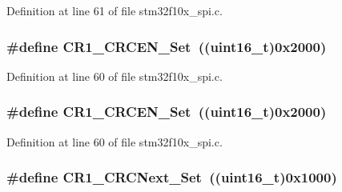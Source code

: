 Definition at line 61 of file stm32f10x\+\_\+spi.\+c.

\subsubsection[{\texorpdfstring{C\+R1\+\_\+\+C\+R\+C\+E\+N\+\_\+\+Set}{CR1_CRCEN_Set}}]{\setlength{\rightskip}{0pt plus 5cm}\#define C\+R1\+\_\+\+C\+R\+C\+E\+N\+\_\+\+Set~(({\bf uint16\+\_\+t})0x2000)}\hypertarget{group___s_p_i___private___defines_gae0b545cdda02753c8e8863e883268011}{}\label{group___s_p_i___private___defines_gae0b545cdda02753c8e8863e883268011}


Definition at line 60 of file stm32f10x\+\_\+spi.\+c.

\subsubsection[{\texorpdfstring{C\+R1\+\_\+\+C\+R\+C\+E\+N\+\_\+\+Set}{CR1_CRCEN_Set}}]{\setlength{\rightskip}{0pt plus 5cm}\#define C\+R1\+\_\+\+C\+R\+C\+E\+N\+\_\+\+Set~(({\bf uint16\+\_\+t})0x2000)}\hypertarget{group___s_p_i___private___defines_gae0b545cdda02753c8e8863e883268011}{}\label{group___s_p_i___private___defines_gae0b545cdda02753c8e8863e883268011}


Definition at line 60 of file stm32f10x\+\_\+spi.\+c.

\subsubsection[{\texorpdfstring{C\+R1\+\_\+\+C\+R\+C\+Next\+\_\+\+Set}{CR1_CRCNext_Set}}]{\setlength{\rightskip}{0pt plus 5cm}\#define C\+R1\+\_\+\+C\+R\+C\+Next\+\_\+\+Set~(({\bf uint16\+\_\+t})0x1000)}\hypertarget{group___s_p_i___private___defines_gaed3a2181ca4095a6488cf6c0ad7a29c6}{}\label{group___s_p_i___private___defines_gaed3a2181ca4095a6488cf6c0ad7a29c6}


